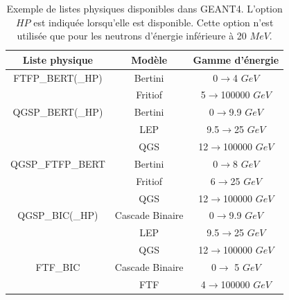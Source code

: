\begin{table}[!ht]
  \begin{center}
    \begin{tabular}{c|c|c}
      Liste physique & Modèle & Gamme d'énergie \\
      \hline
      FTFP\_BERT(\_HP) & Bertini & 0$\rightarrow$4 $GeV$\\
      $ $        & Fritiof & 5$\rightarrow$100000 $GeV$\\
      \hline
      QGSP\_BERT(\_HP) & Bertini & 0$\rightarrow$9.9 $GeV$\\
      $ $        & LEP & 9.5$\rightarrow$25 $GeV$\\
      $ $        & QGS & 12$\rightarrow$100000 $GeV$\\
      \hline
      QGSP\_FTFP\_BERT & Bertini & 0$\rightarrow$8 $GeV$\\
      $ $              & Fritiof & 6$\rightarrow$25 $GeV$\\
      $ $              & QGS & 12$\rightarrow$100000 $GeV$\\
      \hline
      QGSP\_BIC(\_HP) & Cascade Binaire & 0$\rightarrow$9.9 $GeV$\\
      $ $             & LEP & 9.5$\rightarrow$25 $GeV$\\
      $ $             & QGS & 12$\rightarrow$100000 $GeV$\\
      \hline
      FTF\_BIC  & Cascade Binaire & 0$\rightarrow$ 5 $GeV$\\
      $ $       & FTF & 4$\rightarrow$100000 $GeV$\\
    \end{tabular}
  \end{center}
  \caption{Exemple de listes physiques disponibles dans GEANT4. L'option $HP$ est indiquée lorsqu'elle est disponible. Cette option n'est utilisée que pour les neutrons d'énergie inférieure à 20 $MeV$.}
  \label{tab.physList}
\end{table}


